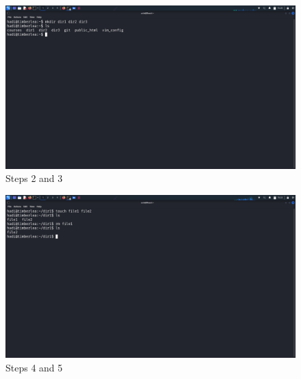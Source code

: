 \documentclass{article}
\numberwithin{equation}{subsection}
\begin{document}
	\begin{figure}[H]
		\caption{Steps 2 and 3}
		\includegraphics[width=450pt]{images/e1qA/2.png}
	\end{figure}
	\begin{figure}[H]
		\caption{Steps 4 and 5}
		\includegraphics[width=450pt]{images/e1qA/4.png}
	\end{figure}
\end{document}

